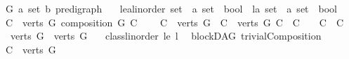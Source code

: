 \begin{isabellebody}
\ \ \ G{\isacharprime}{\kern0pt}\ {\isacharcolon}{\kern0pt}{\isacharcolon}{\kern0pt}{\isachardoublequoteopen}{\isacharparenleft}{\kern0pt}{\isacharprime}{\kern0pt}a\ set{\isacharcomma}{\kern0pt}\ {\isacharprime}{\kern0pt}b{\isacharparenright}{\kern0pt}\ pre{\isacharunderscore}{\kern0pt}digraph{\isachardoublequoteclose}\isanewline
\ \ \ le{\isacharcolon}{\kern0pt}{\isacharcolon}{\kern0pt}{\isachardoublequoteopen}{\isacharprime}{\kern0pt}a{\isacharcolon}{\kern0pt}{\isacharcolon}{\kern0pt}linorder\ set\ {\isasymRightarrow}\ {\isacharprime}{\kern0pt}a\ set\ {\isasymRightarrow}\ bool{\isachardoublequoteclose}\ \ l{\isacharcolon}{\kern0pt}{\isacharcolon}{\kern0pt}{\isachardoublequoteopen}{\isacharprime}{\kern0pt}a\ set\ {\isasymRightarrow}\ {\isacharprime}{\kern0pt}a\ set\ {\isasymRightarrow}\ bool{\isachardoublequoteclose}\isanewline
\ \ \ {\isachardoublequoteopen}{\isasymforall}C\ {\isasymin}\ {\isacharparenleft}{\kern0pt}verts\ G{\isacharprime}{\kern0pt}{\isacharparenright}{\kern0pt}{\isachardot}{\kern0pt}\ composition\ G\ C{\isachardoublequoteclose}\isanewline
\ \ \ {\isachardoublequoteopen}{\isasymforall}\ C{}\ {\isasymin}\ {\isacharparenleft}{\kern0pt}verts\ G{\isacharprime}{\kern0pt}{\isacharparenright}{\kern0pt}{\isachardot}{\kern0pt}\ {\isasymforall}\ C{}\ {\isasymin}\ {\isacharparenleft}{\kern0pt}verts\ G{\isacharprime}{\kern0pt}{\isacharparenright}{\kern0pt}{\isachardot}{\kern0pt}\ C{}\ {\isasyminter}\ C{}\ {\isasymnoteq}\ {\isacharbraceleft}{\kern0pt}{\isacharbraceright}{\kern0pt}\ {\isasymlongrightarrow}\ C{}\ {\isacharequal}{\kern0pt}\ C{}{\isachardoublequoteclose}\isanewline
\ \ \ {\isachardoublequoteopen}{\isasymUnion}\ {\isacharparenleft}{\kern0pt}verts\ G{\isacharprime}{\kern0pt}{\isacharparenright}{\kern0pt}\ {\isacharequal}{\kern0pt}\ verts\ G{\isachardoublequoteclose}\isanewline
\ \ \ {\isachardoublequoteopen}class{\isachardot}{\kern0pt}linorder\ le\ l{\isachardoublequoteclose}%
\isadelimdocument
%
\endisadelimdocument
%
\isatagdocument
%
\isamarkuptrue%
%
\isamarkuptrue%
%
\endisatagdocument
{\isafolddocument}%
%
\isadelimdocument
%
\endisadelimdocument
{}\isamarkupfalse%
\ {\isacharparenleft}{\kern0pt}\ blockDAG{\isacharparenright}{\kern0pt}\ trivialComposition{\isacharcolon}{\kern0pt}\ \isanewline
\ \ \ {\isachardoublequoteopen}C\ {\isacharequal}{\kern0pt}\ verts\ G{\isachardoublequoteclose}\isanewline

\end{isabellebody}
